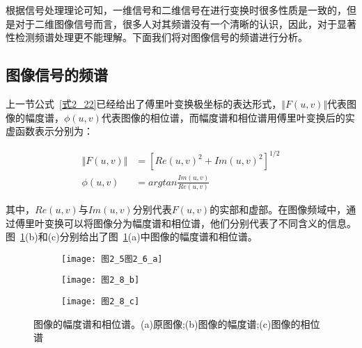 根据信号处理理论可知，一维信号和二维信号在进行变换时很多性质是一致的，但是对于二维图像信号而言，很多人对其频谱没有一个清晰的认识，因此，对于显著性检测频谱处理更不能理解。下面我们将对图像信号的频谱进行分析。

\subsection{图像信号的频谱}
\label{2_3_1}

上一节公式~\ref{式2_22}已经给出了傅里叶变换极坐标的表达形式，$\Vert F(u,v)\Vert$代表图像的幅度谱，$\phi(u,v)$代表图像的相位谱，而幅度谱和相位谱用傅里叶变换后的实虚函数表示分别为：
\begin{linenomath}
\begin{align}
\Vert F(u,v)\Vert &= [Re(u,v)^{2}+Im(u,v)^{2}]^{1/2}\label{式2_35}\\
\phi(u,v) &= arg tan\frac{Im(u,v)}{Re(u,v)}\label{式2_36}
\end{align}
\end{linenomath}
其中，$Re(u,v)$与$Im(u,v)$分别代表$F(u,v)$的实部和虚部。在图像频域中，通过傅里叶变换可以将图像分为幅度谱和相位谱，他们分别代表了不同含义的信息\cite{ZhangRuolan2002frequency}。图~\ref{图2_8}(b)和(c)分别给出了图~\ref{图2_8}(a)中图像的幅度谱和相位谱。
\begin{figure}[h]
  \centering%
  \begin{subfigure}{3cm}
    \texttt{[image: 图2\_5图2\_6\_a]}
    \caption{}
  \end{subfigure}
  \hspace{4em}%
  \begin{subfigure}{0.2\textwidth}
    \texttt{[image: 图2\_8\_b]}
    \caption{}
  \end{subfigure}
  \hspace{4em}%
  \begin{subfigure}{0.25\textwidth}
    \texttt{[image: 图2\_8\_c]}
    \caption{}
  \end{subfigure}
  \caption{图像的幅度谱和相位谱。(a)原图像;(b)图像的幅度谱;(c)图像的相位谱}
  \label{图2_8}
\end{figure}

